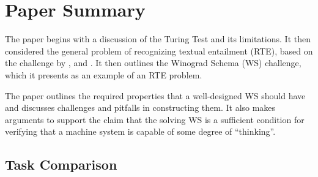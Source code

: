 \documentclass[
10pt, %
a4paper, %
oneside, %
headinclude,footinclude, %
BCOR5mm, %
]{scrartcl}
\begin{document}
\section{Paper Summary}
The paper begins with a discussion of the Turing Test and its limitations. It then considered the general problem of recognizing textual entailment (RTE), based on the challenge by \citet{dagan2006pascal}, \citet{bobrow2007precision} and \citet{rus2008study}. It then outlines the Winograd Schema (WS) challenge, which it presents as an example of an RTE problem.

The paper outlines the required properties that a well-designed WS should have and discusses challenges and pitfalls in constructing them. It also makes arguments to support the claim that the solving WS is a sufficient condition for verifying that a machine system is capable of some degree of ``thinking''.

\subsection{Task Comparison}


\end{document}
